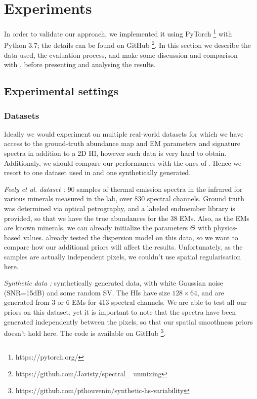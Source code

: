 \documentclass{article}
\begin{document}
\section{Experiments}\label{sec:exp}
In order to validate our approach, we implemented it using \textsf{PyTorch} \footnote{https://pytorch.org/} with \textsf{Python 3.7}; the details can be found on GitHub \footnote{https://github.com/Javisty/spectral\_
unmixing}. In this section we describe the data used, the evaluation process, and make some discussion and comparison with \citet{janiczek_differentiable_2020}, before presenting and analysing the results.

\subsection{Experimental settings}
\subsubsection{Datasets}
Ideally we would experiment on multiple real-world datasets for which we have access to the ground-truth abundance map and EM parameters and signature spectra in addition to a 2D HI, however such data is very hard to obtain. Additionaly, we should compare our performances with the ones of \citet{janiczek_differentiable_2020}. Hence we resort to one dataset used in \citet{janiczek_differentiable_2020} and one synthetically generated.

\textit{Feely et al. dataset \citep{feely}:} 90 samples of thermal emission spectra in the infrared for various minerals measured in the lab, over $830$ spectral channels. Ground truth was determined via optical petrography, and a labeled endmember library is provided, so that we have the true abundances for the $38$ EMs. Also, as the EMs are known minerals, we can already initialize the parameters $\Theta$ with physics-based values. \citeauthor{janiczek_differentiable_2020} already tested the dispersion model on this data, so we want to compare how our additional priors will affect the results. Unfortunately, as the samples are actually independent pixels, we couldn't use spatial regularisation here.

\textit{Synthetic data \citep{thouvenin}:} synthetically generated data, with white Gaussian noise (SNR=15dB) and some random SV. The HIs have size $128 \times 64$, and are generated from $3$ or $6$ EMs for $413$ spectral channels. We are able to test all our priors on this dataset, yet it is important to note that the spectra have been generated independently between the pixels, so that our spatial smoothness priors doesn't hold here. The code is available on GitHub \footnote{https://github.com/pthouvenin/synthetic-hs-variability}.
\end{document}
